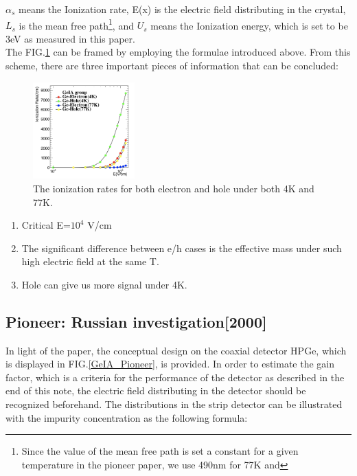 \documentclass[%
 reprint,
 amsmath,amssymb,
 aps,
]{revtex4-2}
\begin{document}
$\alpha_{s}$ means the Ionization rate, E(x) is the electric field distributing in the crystal, $L_{s}$ is the mean free path\footnote{Since the value of the mean free path is set a constant for a given temperature in the pioneer paper, we use 490nm for 77K and  }, and $U_{s}$ means the Ionization energy, which is set to be 3eV as measured in this paper\cite{Wei:2016xbw}.\\

The FIG.\ref{Ionization_rate} can be framed by employing the formulae introduced above. From this scheme, there are three important pieces of information that can be concluded:

\begin{figure}[h]
  \centering
  \includegraphics[width=0.35\textwidth]{SHEME/Ionization_Rate.png}
  \caption{The ionization rates for both electron and hole under both 4K and 77K.}
  \label{Ionization_rate}
\end{figure}

\begin{enumerate}
	\item Critical E=$10^{4}$ V/cm
	\item The significant difference between e/h cases is the effective mass under such high electric field at the same T.
	\item Hole can give us more signal under 4K.
\end{enumerate}

\subsection{Pioneer: Russian investigation[2000]}
In light of the paper\cite{1}, the conceptual design on the coaxial detector HPGe, which is displayed in FIG.\ref{GeIA_Pioneer}, is provided. In order to estimate the gain factor, which is a criteria for the performance of the detector as described in the end of this note, the electric field distributing in the detector should be recognized beforehand. The distributions in the strip detector can be illustrated with the impurity concentration as the following formula:\\
\end{document}
